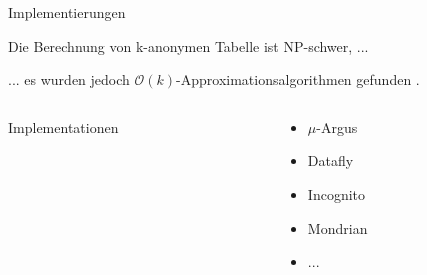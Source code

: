 \begin{frame}[c]{Implementierungen}
	\begin{center}
		Die Berechnung von k-anonymen Tabelle ist NP-schwer, ...\\
		\pause
		\vspace{0.5cm}

		... es wurden jedoch \(\mathcal{O}(k)\)-Approximationsalgorithmen gefunden \cite{aggarwal, meyerson}.

		\vfill

		\begin{columns}[c]
			\begin{column}{0.5\textwidth}	
				\hfill {Implementationen}
			\end{column}
		
			\begin{column}{0.5\textwidth}
				\begin{itemize}
					\item \(\mu\)-Argus
					\item Datafly
					\item Incognito
					\item Mondrian
					\item ...
				\end{itemize}
			\end{column}
		\end{columns}

	\end{center}
\end{frame}
	
